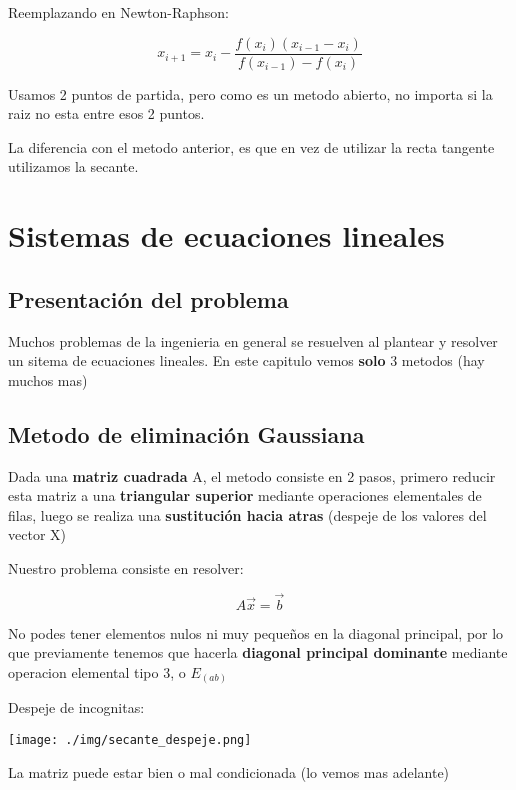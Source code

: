 \documentclass[10pt]{article}
\begin{document}
Reemplazando en Newton-Raphson:

\begin{equation}
	x_{i+1} = x_i - \dfrac{f(x_i)(x_{i-1}-x_i)}{f(x_{i-1})-f(x_i)}
\end{equation}

Usamos 2 puntos de partida, pero como es un metodo abierto, 
no importa si la raiz no esta entre esos 2 puntos.

La diferencia con el metodo anterior, es que en vez de utilizar
la recta tangente utilizamos la secante.

\pagebreak

\section{Sistemas de ecuaciones lineales}

\subsection{Presentación del problema}

Muchos problemas de la ingenieria en general se resuelven
al plantear y resolver un sitema de ecuaciones lineales.
En este capitulo vemos \textbf{solo} 3 metodos (hay muchos mas)

\subsection{Metodo de eliminación Gaussiana}

Dada una \textbf{matriz cuadrada} A, el metodo consiste en 2 pasos,
primero reducir esta matriz a una \textbf{triangular superior} mediante
operaciones elementales de filas, luego se realiza una \textbf{sustitución 
hacia atras} (despeje de los valores del vector X)

Nuestro problema consiste en resolver:

\begin{equation}
	A\overrightarrow{x} = \overrightarrow{b}
\end{equation}

No podes tener elementos nulos ni muy pequeños en la diagonal principal,
por lo que previamente tenemos que hacerla \textbf{diagonal principal dominante}
mediante operacion elemental tipo 3, o $E_{(ab)}$ 

Despeje de incognitas:

\texttt{[image: ./img/secante\_despeje.png]}

La matriz puede estar bien o mal condicionada (lo vemos mas adelante)
\end{document}
